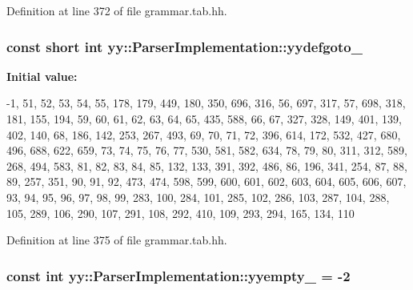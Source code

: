Definition at line 372 of file grammar.tab.hh.

\hypertarget{classyy_1_1_parser_implementation_a96813fa8ea74a994f511555c305a24cd}{
\subsubsection[{yydefgoto\_\-}]{\setlength{\rightskip}{0pt plus 5cm}const short int {\bf yy::ParserImplementation::yydefgoto\_\-}}}
\label{classyy_1_1_parser_implementation_a96813fa8ea74a994f511555c305a24cd}
{\bfseries Initial value:}
\begin{DoxyCode}

  {
        -1,    51,    52,    53,    54,    55,   178,   179,   449,   180,
     350,   696,   316,    56,   697,   317,    57,   698,   318,   181,
     155,   194,    59,    60,    61,    62,    63,    64,    65,   435,
     588,    66,    67,   327,   328,   149,   401,   139,   402,   140,
      68,   186,   142,   253,   267,   493,    69,    70,    71,    72,
     396,   614,   172,   532,   427,   680,   496,   688,   622,   659,
      73,    74,    75,    76,    77,   530,   581,   582,   634,    78,
      79,    80,   311,   312,   589,   268,   494,   583,    81,    82,
      83,    84,    85,   132,   133,   391,   392,   486,    86,   196,
     341,   254,    87,    88,    89,   257,   351,    90,    91,    92,
     473,   474,   598,   599,   600,   601,   602,   603,   604,   605,
     606,   607,    93,    94,    95,    96,    97,    98,    99,   283,
     100,   284,   101,   285,   102,   286,   103,   287,   104,   288,
     105,   289,   106,   290,   107,   291,   108,   292,   410,   109,
     293,   294,   165,   134,   110
  }
\end{DoxyCode}


Definition at line 375 of file grammar.tab.hh.

\hypertarget{classyy_1_1_parser_implementation_ae3d49f6dceae1837e7ebaedab925ff48}{
\subsubsection[{yyempty\_\-}]{\setlength{\rightskip}{0pt plus 5cm}const int {\bf yy::ParserImplementation::yyempty\_\-} = -\/2}}
\label{classyy_1_1_parser_implementation_ae3d49f6dceae1837e7ebaedab925ff48}


